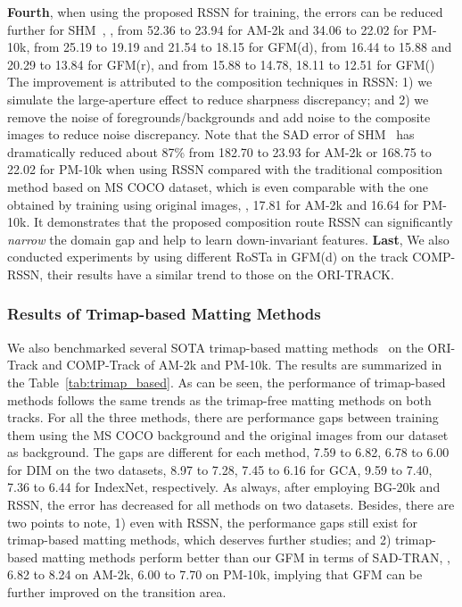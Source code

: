 \documentclass[twocolumn]{svjour3}
\begin{document}
\textbf{Fourth}, when using the proposed RSSN for training, the errors can be reduced further for SHM~\citep{chen2018semantic}, , from 52.36 to  23.94 for AM-2k and 34.06 to 22.02 for PM-10k, from 25.19 to 19.19 and 21.54 to 18.15 for GFM(d), from 16.44 to 15.88 and 20.29 to 13.84 for GFM(r), and from 15.88 to 14.78, 18.11 to 12.51 for GFM() The improvement is attributed to the composition techniques in RSSN: 1) we simulate the large-aperture effect to reduce sharpness discrepancy; and 2) we remove the noise of foregrounds/backgrounds and add noise to the composite images to reduce noise discrepancy. Note that the SAD error of SHM~\citep{chen2018semantic} has dramatically reduced about 87\% from 182.70 to 23.93 for AM-2k or 168.75 to 22.02 for PM-10k when using RSSN compared with the traditional composition method based on MS COCO dataset, which is even comparable with the one obtained by training using original images, , 17.81 for AM-2k and 16.64 for PM-10k. It demonstrates that the proposed composition route RSSN can significantly \textit{narrow} the domain gap and help to learn down-invariant features. \textbf{Last}, We also conducted experiments by using different RoSTa in GFM(d) on the track COMP-RSSN, their results have a similar trend to those on the ORI-TRACK.


\subsubsection{Results of Trimap-based Matting Methods} We also benchmarked several SOTA trimap-based matting methods~\citep{xu2017deep,li2020natural,hao2019indexnet} on the ORI-Track and COMP-Track of AM-2k and PM-10k. The results are summarized in the Table~\ref{tab:trimap_based}. As can be seen, the performance of trimap-based methods follows the same trends as the trimap-free matting methods on both tracks. For all the three methods, there are performance gaps between training them using the MS COCO \citep{lin2014microsoft} background and the original images from our dataset as background. The gaps are different for each method,  7.59 to 6.82, 6.78 to 6.00 for DIM on the two datasets, 8.97 to 7.28, 7.45 to 6.16 for GCA, 9.59 to 7.40, 7.36 to 6.44 for IndexNet, respectively. As always, after employing BG-20k and RSSN, the error has decreased for all methods on two datasets. Besides, there are two points to note, 1) even with RSSN, the performance gaps still exist for trimap-based matting methods, which deserves further studies; and 2) trimap-based matting methods perform better than our GFM in terms of SAD-TRAN, , 6.82 to 8.24 on AM-2k, 6.00 to 7.70 on PM-10k, implying that GFM can be further improved on the transition area.
\end{document}
